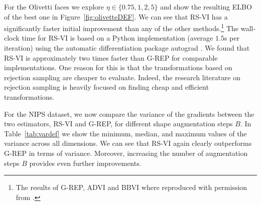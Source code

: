 For the Olivetti faces we explore ${\eta\in\{0.75,1,2,5\}}$ and show the resulting \gls{ELBO} of the best one in Figure~\ref{fig:olivetteDEF}. We can see that \gls{RS-VI} has a significantly faster initial improvement than any of the other methods.\footnote{%
	The results of \gls{G-REP}, \gls{ADVI} and \gls{BBVI} where reproduced with permission from \citet{RuizTB2016}.%
} 
The wall-clock time for \gls{RS-VI} is based on a Python implementation (average $1.5$s per iteration) using the automatic differentiation package autograd \citep{autograd}. We found that \gls{RS-VI} is approximately two times faster than \gls{G-REP} for comparable implementations. One reason for this is that the transformations based on rejection sampling are cheaper to evaluate. Indeed, the research literature on rejection sampling is heavily focused on finding cheap and efficient transformations.


For the \gls{NIPS} dataset, we now compare the variance of the gradients between the two estimators, \gls{RS-VI} and \gls{G-REP}, for different shape augmentation steps $B$. In Table~\ref{tab:vardef} we show the minimum, median, and maximum values of the variance across all dimensions. We can see that \gls{RS-VI} again clearly outperforms \gls{G-REP} in terms of variance. Moreover, increasing the number of augmentation steps $B$ provides even further improvements.%

